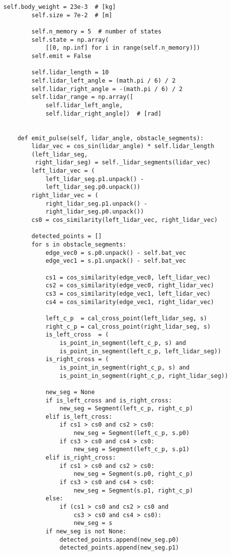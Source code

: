 \documentclass[../appendix]{subfiles}
\begin{document}
\begin{lstlisting}[frame=single]
        self.body_weight = 23e-3  # [kg]
        self.size = 7e-2  # [m]

        self.n_memory = 5  # number of states
        self.state = np.array(
            [[0, np.inf] for i in range(self.n_memory)])
        self.emit = False

        self.lidar_length = 10
        self.lidar_left_angle = (math.pi / 6) / 2
        self.lidar_right_angle = -(math.pi / 6) / 2
        self.lidar_range = np.array([
            self.lidar_left_angle,
            self.lidar_right_angle])  # [rad]
    

    def emit_pulse(self, lidar_angle, obstacle_segments):
        lidar_vec = cos_sin(lidar_angle) * self.lidar_length
        (left_lidar_seg, 
         right_lidar_seg) = self._lidar_segments(lidar_vec)
        left_lidar_vec = (
            left_lidar_seg.p1.unpack() - 
            left_lidar_seg.p0.unpack())
        right_lidar_vec = (
            right_lidar_seg.p1.unpack() - 
            right_lidar_seg.p0.unpack())
        cs0 = cos_similarity(left_lidar_vec, right_lidar_vec)

        detected_points = []
        for s in obstacle_segments:
            edge_vec0 = s.p0.unpack() - self.bat_vec
            edge_vec1 = s.p1.unpack() - self.bat_vec

            cs1 = cos_similarity(edge_vec0, left_lidar_vec)
            cs2 = cos_similarity(edge_vec0, right_lidar_vec)
            cs3 = cos_similarity(edge_vec1, left_lidar_vec)
            cs4 = cos_similarity(edge_vec1, right_lidar_vec)

            left_c_p  = cal_cross_point(left_lidar_seg, s)
            right_c_p = cal_cross_point(right_lidar_seg, s)
            is_left_cross  = (
                is_point_in_segment(left_c_p, s) and 
                is_point_in_segment(left_c_p, left_lidar_seg))
            is_right_cross = (
                is_point_in_segment(right_c_p, s) and 
                is_point_in_segment(right_c_p, right_lidar_seg))

            new_seg = None
            if is_left_cross and is_right_cross:
                new_seg = Segment(left_c_p, right_c_p)
            elif is_left_cross:
                if cs1 > cs0 and cs2 > cs0:
                    new_seg = Segment(left_c_p, s.p0)
                if cs3 > cs0 and cs4 > cs0:
                    new_seg = Segment(left_c_p, s.p1)
            elif is_right_cross:
                if cs1 > cs0 and cs2 > cs0:
                    new_seg = Segment(s.p0, right_c_p)
                if cs3 > cs0 and cs4 > cs0:
                    new_seg = Segment(s.p1, right_c_p)
            else:
                if (cs1 > cs0 and cs2 > cs0 and 
                    cs3 > cs0 and cs4 > cs0):
                    new_seg = s
            if new_seg is not None:
                detected_points.append(new_seg.p0)
                detected_points.append(new_seg.p1)
        

\end{lstlisting}
\end{document}
